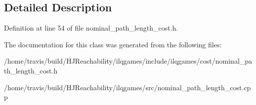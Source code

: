 \subsection{Detailed Description}


Definition at line 54 of file nominal\+\_\+path\+\_\+length\+\_\+cost.\+h.



The documentation for this class was generated from the following files\+:\begin{DoxyCompactItemize}
\item 
/home/travis/build/\+H\+J\+Reachability/ilqgames/include/ilqgames/cost/nominal\+\_\+path\+\_\+length\+\_\+cost.\+h\item 
/home/travis/build/\+H\+J\+Reachability/ilqgames/src/nominal\+\_\+path\+\_\+length\+\_\+cost.\+cpp\end{DoxyCompactItemize}
